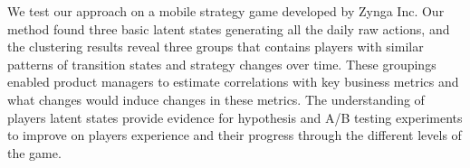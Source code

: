 We test our approach on a mobile strategy game developed by Zynga Inc. %
Our method found three basic latent  states generating all the daily raw actions, and  the clustering results reveal three 
 groups that contains players with similar patterns of transition states and strategy changes over time.  These groupings enabled product managers to estimate correlations with key business metrics and what changes would induce changes in these metrics.  The understanding of players latent states provide evidence for hypothesis and A/B testing experiments to improve on players experience and their progress through the different levels of the game.


